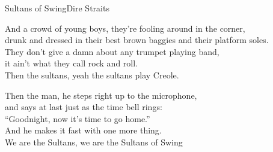 \begin{song}{Sultans of Swing}{Dire Straits}
\medskip
{}
\begin{guitar}
And a crowd of young boys, they're fooling around in the corner,\\
drunk and dressed in their best brown baggies and their platform soles.\\
They don't give a damn about any trumpet playing band,\\
it ain't what they call rock and roll.\\
Then the sultans, yeah the sultans play Creole.\\
\end{guitar}

\medskip
{}

\medskip
{}
\begin{guitar}
Then the man, he steps right up to the microphone,\\
and says at last just as the time bell rings:\\
“Goodnight, now it's time to go home.”\\
And he makes it fast with one more thing.\\
We are the Sultans, we are the Sultans of Swing\\
\end{guitar}

\end{song}
